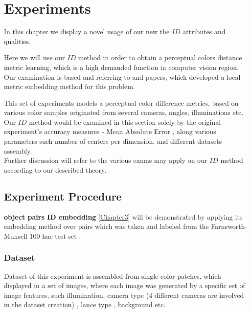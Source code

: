 
\chapter{Experiments} %

\label{Chapter8}

In this chapter we display a novel usage of our new the $ID$ attributes and qualities.

Here we will use our $ID$ method in order to obtain a perceptual colors distance metric learning, which is a high demanded function in computer vision region. Our examination is based and referring to \cite{perp_color} and \cite{c2lm} papers, which developed a local metric embedding method for this problem. 

This set of experiments models a perceptual color difference metrics, based on various color samples originated from several cameras, angles, illuminations etc.
\\

Our $ID$ method would be examined in this section solely by the original experiment's accuracy measures - Mean Absolute Error \cite{MAE}, along various parameters such number of centers per dimension, and different datasets assembly.
\\
Further discussion will refer to the various exams may apply on our $ID$ method according to our described theory.

\section{Experiment Procedure}

\textbf{object pairs ID embedding} \ref{Chapter3} will be demonstrated by applying its embedding method over pairs which was taken and labeled from the Farnsworth-Munsell 100 hue-test set \cite{furnsworth}.
\subsection{Dataset}

Dataset of this experiment is assembled from single color patches, which displayed in a set of images, where each image was generated by a specific set of image features, such illumination, camera type (4 different cameras are involved in the dataset creation) , lance type , background etc.

